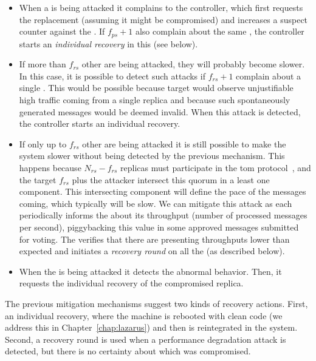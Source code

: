 \begin{itemize}

\item When a \presieve is being attacked it complains to the controller, which first requests the \presieve replacement (assuming it might be compromised) and increases a suspect counter against the \repsieve.
If $f_{ps}+1$ \presieves also complain about the same \repsieve, the controller starts an \emph{individual recovery} in this \repsieve (see below).

\item If more than $f_{rs}$ other \repsieves are being attacked, they will probably become slower.
In this case, it is possible to detect such attacks if $f_{rs}+1$ \repsieves complain about a single \repsieve.
This would be possible because target \repsieves would observe unjustifiable high traffic coming from a single replica and because such spontaneously generated messages would be deemed invalid.
When this attack is detected, the controller starts an individual \repsieve recovery.

\item If only up to $f_{rs}$ other \repsieves are being attacked it is still possible to make the system slower without being detected by the previous mechanism.
This happens because $N_{rs}-f_{rs}$ replicas must participate in the \gls{tom} protocol~\cite{Bessani:2014}, and the target $f_{rs}$ plus the attacker intersect this quorum in a least one component. 
This intersecting component will define the pace of the messages coming, which typically will be slow.
We can mitigate this attack as each \repsieve periodically informs the \postsieve about its throughput (number of processed messages per second), piggybacking this value in some approved messages submitted for voting.
The \postsieve verifies that there are \repsieves presenting throughputs lower than expected and initiates a \emph{recovery round} on all the \repsieves (as described below).

\item When the \postsieve is being attacked it detects the abnormal behavior.
Then, it requests the individual recovery of the compromised replica.

\end{itemize}

The previous mitigation mechanisms suggest two kinds of recovery actions.
First, an individual recovery, where the machine is rebooted with clean code (we address this in Chapter~\ref{chap:lazarus}) and then is reintegrated in the system.
Second, a recovery round is used when a performance degradation attack is detected, but there is no certainty about which \repsieve was compromised.


